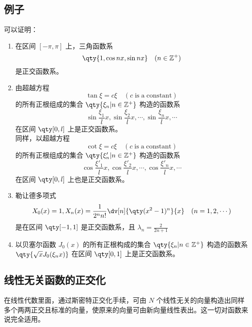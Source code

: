 \subsection{例子}
可以证明：
\begin{enumerate}
\item 在区间 $[-\pi,\pi]$ 上，三角函数系
\begin{equation}
\qty{1,\cos nx,\sin nx}\quad(n\in \mathbb{Z^{+}})
\end{equation}
是正交函数系。
\item 由超越方程
\begin{equation}
\tan\xi=c\xi \quad(c\; \mathrm{is\; a\; constant})
\end{equation}
 的所有正根组成的集合 $\qty{\xi_n\vert n\in\mathbb{Z}^+}$
 构造的函数系
 \begin{equation}
 \sin\frac{\xi_1}{l}x,\sin\frac{\xi_2}{l}x,\cdots,\sin\frac{\xi_n}{l}x,\cdots
 \end{equation}
 在区间 $\qty[0,l]$ 上是正交函数系。\\
 
 同样，以超越方程
\begin{equation}
\cot\xi=c\xi \quad(c\; \mathrm{is\; a\; constant})
\end{equation}
 的所有正根组成的集合 $\qty{\xi'_n\vert n\in\mathbb{Z}^+}$
 构造的函数系
 \begin{equation}
 \cos\frac{\xi'_1}{l}x,\cos\frac{\xi'_2}{l}x,\cdots,\cos\frac{\xi'_n}{l}x,\cdots
 \end{equation}
 在区间 $\qty[0,l]$ 上也是正交函数系。
 \item 勒让德多项式
\begin{equation}
X_0(x)=1,X_n(x)=\frac{1}{2^nn!}\dv[n]{\qty(x^2-1)^n}{x}\quad(n=1,2,\cdots)
\end{equation}
是在区间 $\qty[-1,1]$ 是正交函数系，且 $\lambda_n=\frac{2}{2n+1}$
\item 以贝塞尔函数 $J_0(x)$ 的所有正根构成的集合 $\qty{\xi_n\vert n\in\mathbb{Z}^+}$
构造的函数系 $\qty{\sqrt{x}J_0(\xi_n x)} $ 在区间 $\qty[0,1]$ 上是正交函数系。
\end{enumerate}

\subsection{线性无关函数的正交化}
在线性代数里面，通过斯密特正交化手续，可由 $N$ 个线性无关的向量构造出同样多个两两正交且标准的向量，使原来的向量可由新向量线性表出。这一切对函数来说完全适用。

